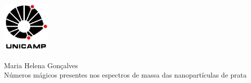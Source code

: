 \pagestyle{plain}
\thispagestyle{empty}
\vspace{-5cm}
\includegraphics[width=.94\textwidth, height=1in,
keepaspectratio=true]{logos/logo_Unicamp}

\begin{center}
{\large Maria Helena Gonçalves}\\ 
\vspace{7.5cm}
{\huge Números mágicos presentes
\vspace{0.4cm}
nos espectros de massa das nanopartículas de prata}

\vspace{3.5cm}

\end{center}

\begin{center}



\vspace{2cm}







\end{center}

\vspace{2cm}

\begin{center}

 \\
 \\

\end{center}

